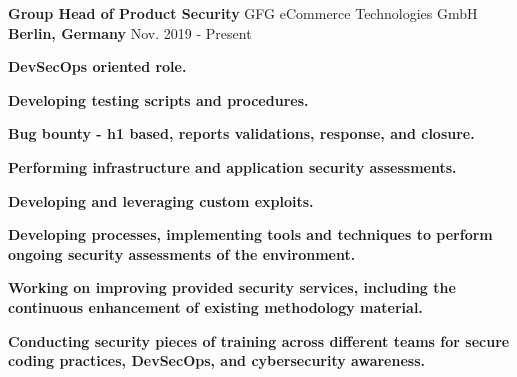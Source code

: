 

\begin{cventries}

\cventry
{\textbf{\Large Group Head of Product Security}} %
{GFG eCommerce Technologies GmbH} %
{\textbf{\Large Berlin, Germany}} %
{Nov. 2019 - Present} %
{
\begin{cvitems} %
\item {\textbf{\large DevSecOps oriented role.}}
\item {\textbf{\large Developing testing scripts and procedures.}}
\item {\textbf{\large Bug bounty - h1 based, reports validations, response, and closure.}}
\item {\textbf{\large Performing infrastructure and application security assessments.}}
\item {\textbf{\large Developing and leveraging custom exploits.}}
\item {\textbf{\large Developing processes, implementing tools and techniques to perform ongoing security assessments of the environment.}}
\item {\textbf{\large Working on improving provided security services, including the continuous enhancement of existing methodology material.}}
\item {\textbf{\large Conducting security pieces of training across different teams for secure coding practices, DevSecOps, and cybersecurity awareness.}}
\end{cvitems}
}


\end{cventries}
